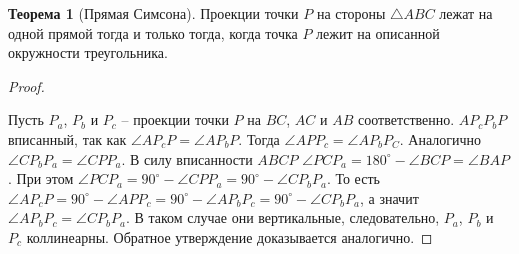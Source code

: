 \documentclass[12pt]{article}
\theoremstyle{definition}
\newtheorem{theorem}{Теорема}[section]
\begin{document}
    \begin{theorem}[Прямая Симсона]
        Проекции точки $P$ на стороны $\triangle ABC$ лежат на одной прямой тогда и только тогда, когда точка $P$ лежит на описанной окружности треугольника.
    \end{theorem}
    \begin{proof}
    $ $\newline
        \begin{center}
        \end{center}
        Пусть $P_a$, $P_b$ и $P_c$ -- проекции точки $P$ на $BC$, $AC$ и $AB$ соответственно. $AP_cP_bP$ вписанный, так как $\angle AP_cP=\angle AP_bP$. Тогда $\angle APP_c=\angle AP_bP_C$. Аналогично $\angle CP_bP_a=\angle CPP_a$. В силу вписанности $ABCP$ $\angle PCP_a=180^{\circ}-\angle BCP=\angle BAP$. При этом $\angle PCP_a=90^{\circ}-\angle CPP_a=90^{\circ}-\angle CP_bP_a$. То есть $\angle AP_cP=90^{\circ}-\angle APP_c=90^{\circ}-\angle AP_bP_c=90^{\circ}-\angle CP_bP_a$, а значит $\angle AP_bP_c=\angle CP_bP_a$. В таком случае они вертикальные, следовательно, $P_a$, $P_b$ и $P_c$ коллинеарны. Обратное утверждение доказывается аналогично.
    \end{proof}
\end{document}
